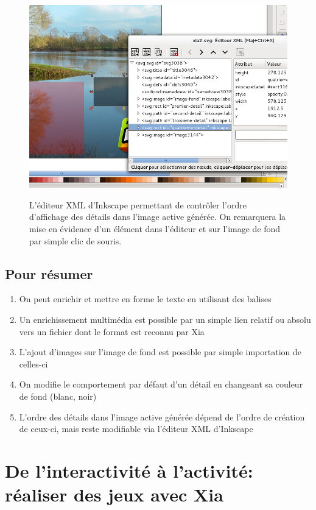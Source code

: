 {\begin{figure}[htp]
 \centering
 \caption{L'éditeur XML d'Inkscape permettant de contrôler l'ordre d'affichage des détails dans l'image 
 active générée. On remarquera la mise en évidence d'un élément dans l'éditeur et sur l'image de fond 
 par simple clic de souris.}
 \includegraphics[width=\textwidth]{images/ordre_couches}
 \label{ordre_couches}
\end{figure}

\subsection{Pour résumer}

\begin{enumerate}
 \item On peut enrichir et mettre en forme le texte en utilisant des balises
 \item Un enrichissement multimédia est possible par un simple lien relatif ou absolu vers un fichier 
 dont le format est reconnu par Xia
 \item L'ajout d'images sur l'image de fond est possible par simple importation de celles-ci
 \item On modifie le comportement par défaut d'un détail en changeant sa couleur de fond (blanc, noir)
 \item L'ordre des détails dans l'image active générée dépend de l'ordre de création de ceux-ci, 
 mais reste modifiable via l'éditeur XML d'Inkscape
\end{enumerate}


\section{De l'interactivité à l'activité: réaliser des jeux avec Xia}

}
